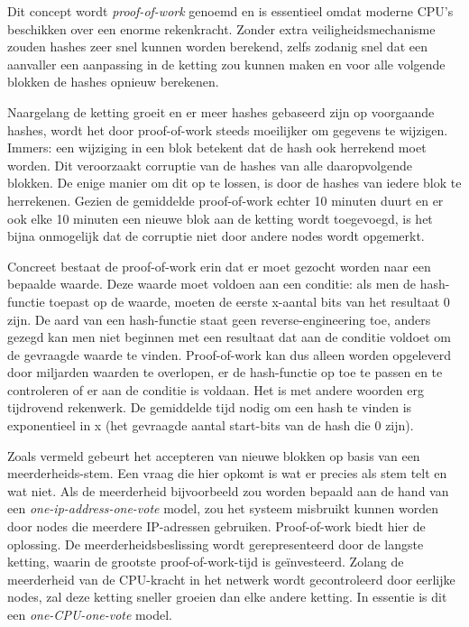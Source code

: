 	Dit concept wordt \textit{proof-of-work} genoemd en is essentieel omdat moderne CPU’s beschikken over een enorme rekenkracht. Zonder extra veiligheidsmechanisme zouden hashes zeer snel kunnen worden berekend, zelfs zodanig snel dat een aanvaller een aanpassing in de ketting zou kunnen maken en voor alle volgende blokken de hashes opnieuw berekenen.~\autocite{Nakamoto2008}
	
	Naargelang de ketting groeit en er meer hashes gebaseerd zijn op voorgaande hashes, wordt het door proof-of-work steeds moeilijker om gegevens te wijzigen. Immers: een wijziging in een blok betekent dat de hash ook herrekend moet worden. Dit veroorzaakt corruptie van de hashes van alle daaropvolgende blokken. De enige manier om dit op te lossen, is door de hashes van iedere blok te herrekenen. Gezien de gemiddelde proof-of-work echter 10 minuten duurt en er ook elke 10 minuten een nieuwe blok aan de ketting wordt toegevoegd, is het bijna onmogelijk dat de corruptie niet door andere nodes wordt opgemerkt.~\autocite{Nakamoto2008}
	
	Concreet bestaat de proof-of-work erin dat er moet gezocht worden naar een bepaalde waarde. Deze waarde moet voldoen aan een conditie: als men de hash-functie toepast op de waarde, moeten de eerste x-aantal bits van het resultaat 0 zijn. De aard van een hash-functie staat geen reverse-engineering toe, anders gezegd kan men niet beginnen met een resultaat dat aan de conditie voldoet om de gevraagde waarde te vinden. Proof-of-work kan dus alleen worden opgeleverd door miljarden waarden te overlopen, er de hash-functie op toe te passen en te controleren of er aan de conditie is voldaan. Het is met andere woorden erg tijdrovend rekenwerk. De gemiddelde tijd nodig om een hash te vinden is exponentieel in x (het gevraagde aantal start-bits van de hash die 0 zijn).~\autocite{Nakamoto2008}
	
	Zoals vermeld gebeurt het accepteren van nieuwe blokken op basis van een meerderheids-stem. Een vraag die hier opkomt is wat er precies als stem telt en wat niet. Als de meerderheid bijvoorbeeld zou worden bepaald aan de hand van een \textit{one-ip-address-one-vote} model, zou het systeem misbruikt kunnen worden door nodes die meerdere IP-adressen gebruiken. Proof-of-work biedt hier de oplossing. De meerderheidsbeslissing wordt gerepresenteerd door de langste ketting, waarin de grootste proof-of-work-tijd is geïnvesteerd. Zolang de meerderheid van de CPU-kracht in het netwerk wordt gecontroleerd door eerlijke nodes, zal deze ketting sneller groeien dan elke andere ketting. In essentie is dit een \textit{one-CPU-one-vote} model.~\autocite{Nakamoto2008}
	
